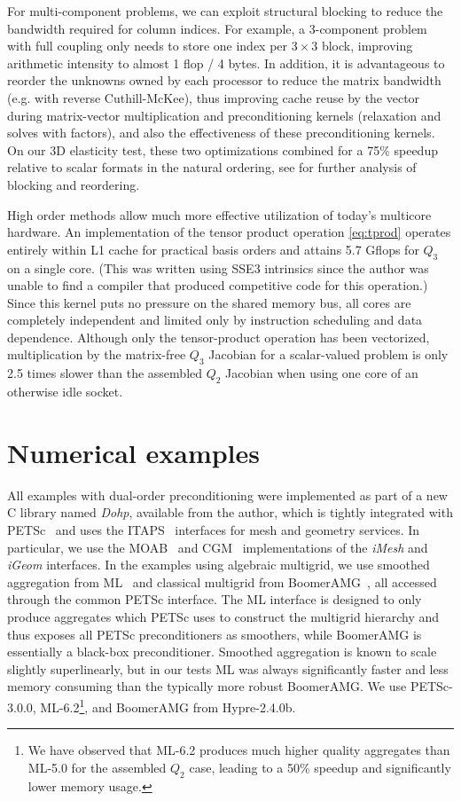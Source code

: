 For multi-component problems, we can exploit structural blocking to reduce the bandwidth required for column indices.
For example, a 3-component problem with full coupling only needs to store one index per $3\times 3$ block, improving
arithmetic intensity to almost 1 flop / 4 bytes.  In addition, it is advantageous to reorder the unknowns owned by each
processor to reduce the matrix bandwidth (e.g. with reverse Cuthill-McKee), thus improving cache reuse by the vector
during matrix-vector multiplication and preconditioning kernels (relaxation and solves with factors), and also the
effectiveness of these preconditioning kernels.  On our 3D elasticity test, these two optimizations combined for a 75\%
speedup relative to scalar formats in the natural ordering, see \cite{gropp2000pmt} for further analysis of blocking and
reordering.

High order methods allow much more effective utilization of today's multicore hardware.  An implementation of the tensor
product operation \eqref{eq:tprod} operates entirely within L1 cache for practical basis orders and attains 5.7 Gflops
for $Q_3$ on a single core.  (This was written using SSE3 intrinsics since the author was unable to find a compiler that
produced competitive code for this operation.)  Since this kernel puts no pressure on the shared memory bus, all cores
are completely independent and limited only by instruction scheduling and data dependence.  Although only the
tensor-product operation has been vectorized, multiplication by the matrix-free $Q_3$ Jacobian for a scalar-valued
problem is only 2.5 times slower than the assembled $Q_2$ Jacobian when using one core of an otherwise idle socket.

\section{Numerical examples}\label{sec:examples}
All examples with dual-order preconditioning were implemented as part of a new C library named \emph{Dohp}, available
from the author, which is tightly integrated with PETSc~\cite{petsc-user-ref} and uses the ITAPS~\cite{itapsproject}
interfaces for mesh and geometry services.  In particular, we use the MOAB~\cite{moab} and CGM~\cite{cgm}
implementations of the \emph{iMesh} and \emph{iGeom} interfaces.  In the examples using algebraic multigrid, we use
smoothed aggregation from ML~\cite{ml-guide} and classical multigrid from BoomerAMG~\cite{henson2002bpa}, all accessed
through the common PETSc interface.  The ML interface is designed to only produce aggregates which PETSc uses to
construct the multigrid hierarchy and thus exposes all PETSc preconditioners as smoothers, while BoomerAMG is
essentially a black-box preconditioner.  Smoothed aggregation is known to scale slightly superlinearly, but in our tests
ML was always significantly faster and less memory consuming than the typically more robust BoomerAMG.  We use
PETSc-3.0.0, ML-6.2\footnote{We have observed that ML-6.2 produces much higher quality aggregates than ML-5.0 for the
  assembled $Q_2$ case, leading to a 50\% speedup and significantly lower memory usage.}, and BoomerAMG from
Hypre-2.4.0b.

